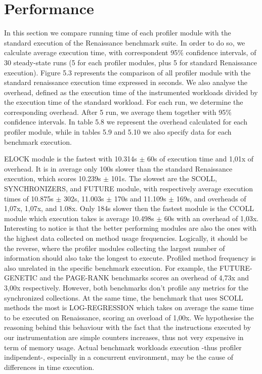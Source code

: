 \documentclass[]{usiinfthesis}
\begin{document}
\section{Performance}
In this section we compare running time of each profiler module with the standard execution of the Renaissance benchmark suite. In order to do so, we calculate average execution time, with correspondent 95\% confidence intervals, of 30 steady-state runs (5 for each profiler modules, plus 5 for standard Renaissance execution). Figure 5.3 represents the comparison of all profiler module with the standard renaissance execution time expressed in seconds. We also analyse the overhead, defined as the execution time of the instrumented workloads divided by the execution time of the standard workload. For each run, we determine the corresponding overhead. After 5 run, we average them together with 95\% confidence intervals. In table 5.8 we represent the overhead calculated for each profiler module, while in tables 5.9 and 5.10 we also specify data for each benchmark execution.

ELOCK module is the fastest with 10.314s $\pm$ 60s of execution time and 1,01x of overhead. It is in average only 100s slower than the standard Renaissance execution, which scores 10.239s $\pm$ 101s. The slowest are the SCOLL, SYNCHRONIZERS, and FUTURE module, with respectively average execution times of 10.875s $\pm$ 302s, 11.003s $\pm$ 170s and 11.109s $\pm$ 169s, and overheads of 1,07x, 1,07x, and 1.08x. Only 184s slower then the fastest module is the CCOLL module which execution takes is average 10.498s $\pm$ 60s with an overhead of 1,03x. Interesting to notice is that the better performing modules are also the ones with the highest data collected on method usage frequencies. Logically, it should be the reverse, where the profiler modules collecting the largest number of information should also take the longest to execute. Profiled method frequency is also unrelated in the specific benchmark execution. For example, the FUTURE-GENETIC and the PAGE-RANK benchmarks scores an overhead of 4,73x and 3,00x respectively. However, both benchmarks don't profile any metrics for the synchronized collections. At the same time, the benchmark that uses SCOLL methods the most is LOG-REGRESSION which takes on average the same time to be executed on Renaissance, scoring an overload of 1,00x. We hypothesise the reasoning behind this behaviour with the fact that the instructions executed by our instrumentation are simple counters increases, thus not very expensive in term of memory usage. Actual benchmark workloads execution -thus profiler indipendent-, especially in a concurrent environment, may be the cause of differences in time execution.
\end{document}
